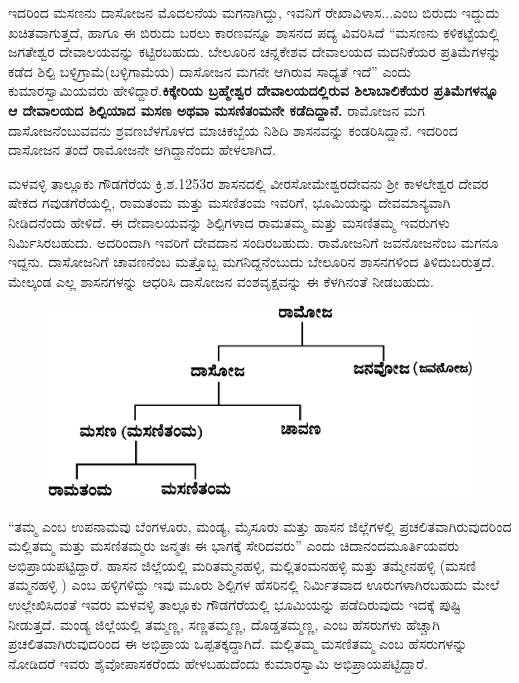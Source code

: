 ಇದರಿಂದ ಮಸಣನು ದಾಸೋಜನ ಮೊದಲನೆಯ ಮಗನಾಗಿದ್ದು, ಇವನಿಗೆ ರೇಖಾವಿಳಾಸ...ಎಂಬ ಬಿರುದು ಇದ್ದುದು ಖಚಿತವಾಗುತ್ತದೆ, ಹಾಗೂ ಈ ಬಿರುದು ಬರಲು ಕಾರಣವನ್ನೂ ಶಾಸನದ ಪದ್ಯ ವಿವರಿಸಿದೆ “ಮಸಣನು ಕಳಿಕಟ್ಟೆಯಲ್ಲಿ ಜಗತೇಶ್ವರ ದೇವಾಲಯವನ್ನು ಕಟ್ಟಿರಬಹುದು. ಬೇಲೂರಿನ ಚನ್ನಕೇಶವ ದೇವಾಲಯದ ಮದನಿಕೆಯರ ಪ್ರತಿಮೆಗಳನ್ನು ಕಡೆದ ಶಿಲ್ಪಿ ಬಳ್ಳಿಗ್ರಾಮೆ(ಬಳ್ಳಿಗಾಮೆಯ) ದಾಸೋಜನ ಮಗನೇ ಆಗಿರುವ ಸಾಧ್ಯತೆ ಇದೆ” ಎಂದು ಕುಮಾರಸ್ವಾಮಿಯವರು ಹೇಳಿದ್ದಾರೆ.\textbf{ಕಿಕ್ಕೇರಿಯ ಬ್ರಹ್ಮೇಶ್ವರ ದೇವಾಲಯದಲ್ಲಿರುವ ಶಿಲಾಬಾಲಿಕೆಯರ ಪ್ರತಿಮೆಗಳನ್ನೂ ಆ ದೇವಾಲಯದ ಶಿಲ್ಪಿಯಾದ ಮಸಣ ಅಥವಾ ಮಸಣಿತಂಮನೇ ಕಡೆದಿದ್ದಾನೆ.} ರಾಮೋಜನ ಮಗ ದಾಸೋಜನೆಂಬುವವನು ಶ್ರವಣಬೆಳಗೊಳದ ಮಾಚಿಕಬ್ಬೆಯ ನಿಶಿದಿ ಶಾಸನವನ್ನು ಕಂಡರಿಸಿದ್ದಾನೆ. ಇದರಿಂದ ದಾಸೋಜನ ತಂದೆ ರಾಮೋಜನೇ ಆಗಿದ್ದಾನೆಂದು ಹೇಳಲಾಗಿದೆ.

ಮಳವಳ್ಳಿ ತಾಲ್ಲೂಕು ಗೌಡಗೆರೆಯ ಕ್ರಿ.ಶ.1253ರ ಶಾಸನದಲ್ಲಿ ವೀರಸೋಮೇಶ್ವರದೇವನು ಶ‍್ರೀ ಕಾಳಲೇಶ್ವರ ದೇವರ ಷೇಕದ ಗವುಡಗೆರೆಯಲ್ಲಿ, ರಾಮತಂಮ ಮತ್ತು ಮಸಣಿತಂಮ ಇವರಿಗೆ, ಭೂಮಿಯನ್ನು ದೇವಮಾನ್ಯವಾಗಿ ನೀಡಿದನೆಂದು ಹೇಳಿದೆ. ಈ ದೇವಾಲಯವನ್ನು ಶಿಲ್ಪಿಗಳಾದ ರಾಮತಮ್ಮ ಮತ್ತು ಮಸಣಿತಮ್ಮ ಇವರುಗಳು ನಿರ್ಮಿಸಿರ\-ಬಹುದು. ಅದರಿಂದಾಗಿ ಇವರಿಗೆ ದೇವದಾನ ಸಂದಿರಬಹುದು. ರಾಮೋಜನಿಗೆ ಜವನೋಜನೆಂಬ ಮಗನೂ ಇದ್ದನು. ದಾಸೋಜನಿಗೆ ಚಾವಣನೆಂಬ ಮತ್ತೊಬ್ಬ ಮಗನಿದ್ದನೆಂಬುದು ಬೇಲೂರಿನ ಶಾಸನಗಳಿಂದ ತಿಳಿದುಬರುತ್ತದೆ. ಮೇಲ್ಕಂಡ ಎಲ್ಲ ಶಾಸನಗಳನ್ನು ಆಧರಿಸಿ ದಾಸೋಜನ ವಂಶವೃಕ್ಷವನ್ನು ಈ ಕೆಳಗಿನಂತೆ ನೀಡಬಹುದು.

\begin{figure}[!h]
\includegraphics[scale=.9]{images/chap5/chap5fig3.jpeg}
\end{figure}

“ತಮ್ಮ ಎಂಬ ಉಪನಾಮವು ಬೆಂಗಳೂರು, ಮಂಡ್ಯ, ಮೈಸೂರು ಮತ್ತು ಹಾಸನ ಜಿಲ್ಲೆಗಳಲ್ಲಿ ಪ್ರಚಲಿತವಾಗಿರುವುದ\-ರಿಂದ ಮಲ್ಲಿತಮ್ಮ ಮತ್ತು ಮಸಣಿತಮ್ಮರು ಜನ್ಮತಃ ಈ ಭಾಗಕ್ಕೆ ಸೇರಿದವರು” ಎಂದು ಚಿದಾನಂದಮೂರ್ತಿಯವರು ಅಭಿಪ್ರಾಯಪಟ್ಟಿದ್ದಾರೆ. ಹಾಸನ ಜಿಲ್ಲೆಯಲ್ಲಿ ಮರಿತಮ್ಮನಹಳ್ಳಿ, ಮಲ್ಲಿತಂಮನಹಳ್ಳಿ ಮತ್ತು ತಮ್ಮೇನಹಳ್ಳಿ (ಮಸಣಿ ತಮ್ಮನಹಳ್ಳಿ ) ಎಂಬ ಹಳ್ಳಿಗಳಿದ್ದು ಇವು ಮೂರು ಶಿಲ್ಪಿಗಳ ಹೆಸರಿನಲ್ಲಿ ನಿರ್ಮಿತವಾದ ಊರುಗಳಾಗಿರಬಹುದು ಮೇಲೆ ಉಲ್ಲೇಖಿಸಿದಂತೆ ಇವರು ಮಳವಳ್ಳಿ ತಾಲ್ಲೂಕು ಗೌಡಗೆರೆಯಲ್ಲಿ ಭೂಮಿಯನ್ನು ಪಡೆದಿರುವುದು ಇದಕ್ಕೆ ಪುಷ್ಟಿ ನೀಡುತ್ತದೆ. ಮಂಡ್ಯ ಜಿಲ್ಲೆಯಲ್ಲಿ ತಮ್ಮಣ್ಣ, ಸಣ್ಣತಮ್ಮಣ್ಣ, ದೊಡ್ಡತಮ್ಮಣ್ಣ, ಎಂಬ ಹೆಸರುಗಳು ಹೆಚ್ಚಾಗಿ ಪ್ರಚಲಿತವಾಗಿರುವುದರಿಂದ ಈ ಅಭಿಪ್ರಾಯ ಒಪ್ಪತಕ್ಕದ್ದಾಗಿದೆ. ಮಲ್ಲಿತಮ್ಮ ಮಸಣಿತಮ್ಮ ಎಂಬ ಹೆಸರುಗಳನ್ನು ನೋಡಿದರೆ ಇವರು ಶೈವೋಪಾಸಕರೆಂದು ಹೇಳಬಹುದೆಂದು ಕುಮಾರಸ್ವಾಮಿ ಅಭಿಪ್ರಾಯಪಟ್ಟಿದ್ದಾರೆ.

